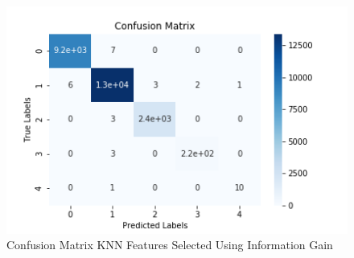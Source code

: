 \documentclass{article}
\begin{document}
\begin{figure}[htbp]
\centering
\includegraphics[scale=0.5]{figures/cm_knn_ig.png}
\caption{Confusion Matrix KNN Features Selected Using Information Gain}
\label{fig:dt_cm_gini_corr}
\end{figure}
\end{document}
